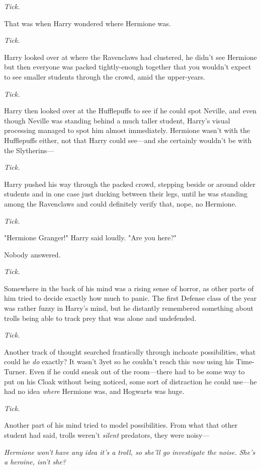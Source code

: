 \emph{Tick.}

That was when Harry wondered where Hermione was.

\emph{Tick.}

Harry looked over at where the Ravenclaws had clustered, he didn't see Hermione
but then everyone was packed tightly-enough together that you wouldn't expect
to see smaller students through the crowd, amid the upper-years.

\emph{Tick.}

Harry then looked over at the Hufflepuffs to see if he could spot Neville, and
even though Neville was standing behind a much taller student, Harry's visual
processing managed to spot him almost immediately. Hermione wasn't with the
Hufflepuffs either, not that Harry could see—and she certainly wouldn't be
with the Slytherins—

\emph{Tick.}

Harry pushed his way through the packed crowd, stepping beside or around older
students and in one case just ducking between their legs, until he was standing
among the Ravenclaws and could definitely verify that, nope, no Hermione.

\emph{Tick.}

"Hermione Granger!" Harry said loudly. "Are you here?"

Nobody answered.

\emph{Tick.}

Somewhere in the back of his mind was a rising sense of horror, as other parts
of him tried to decide exactly how much to panic. The first Defense class of
the year was rather fuzzy in Harry's mind, but he distantly remembered
something about trolls being able to track prey that was alone and undefended.

\emph{Tick.}

Another track of thought searched frantically through inchoate possibilities,
what could he \emph{do} exactly? It wasn't 3\PM yet so he couldn't reach this
\emph{now} using his Time-Turner. Even if he could sneak out of the
room—there had to be some way to put on his Cloak without being noticed, some
sort of distraction he could use—he had no idea \emph{where} Hermione was,
and Hogwarts was huge.

\emph{Tick.}

Another part of his mind tried to model possibilities. From what that other
student had said, trolls weren't \emph{silent} predators, they were noisy—

\emph{Hermione won't have any idea it's a troll, so she'll go investigate the
noise. She's a heroine, isn't she?}

